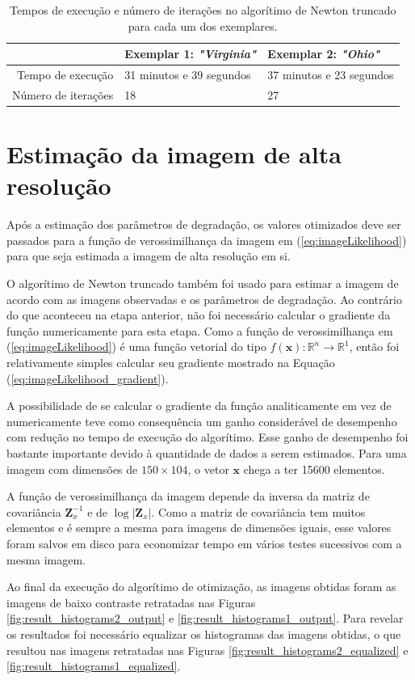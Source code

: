 \begin{table}[H]
	\caption{Tempos de execução e número de iterações no algorítimo de Newton truncado para cada um dos exemplares.}
	\label{tab:temposexec}
	\begin{tabular}{r || l | l}
		 & Exemplar 1: \emph{"Virginia"} & Exemplar 2: \emph{"Ohio"} \\ \hline
		Tempo de execução & 31 minutos e 39 segundos & 37 minutos e 23 segundos \\ \hline
		Número de iterações & 18 & 27
	\end{tabular}
\end{table}

\clearpage
\section{Estimação da imagem de alta resolução}
\label{sec:imgestimation}
Após a estimação dos parâmetros de degradação, os valores otimizados deve ser passados para a função de verossimilhança da imagem em (\ref{eq:imageLikelihood}) para que seja estimada a imagem de alta resolução em si.

O algorítimo de Newton truncado também foi usado para estimar a imagem de acordo com as imagens observadas e os parâmetros de degradação.
Ao contrário do que aconteceu na etapa anterior, não foi necessário calcular o gradiente da função numericamente para esta etapa.
Como a função de verossimilhança em (\ref{eq:imageLikelihood}) é uma função vetorial do tipo $ f(\mathbf{x}) : \mathbb{R}^n \to \mathbb{R}^1$, então foi relativamente simples calcular seu gradiente mostrado na Equação (\ref{eq:imageLikelihood_gradient}).

A possibilidade de se calcular o gradiente da função analiticamente em vez de numericamente teve como consequência um ganho considerável de desempenho com redução no tempo de execução do algorítimo.
Esse ganho de desempenho foi bastante importante devido à quantidade de dados a serem estimados.
Para uma imagem com dimensões de $150 \times 104$, o vetor $\mathbf{x}$ chega a ter 15600 elementos.

A função de verossimilhança da imagem depende da inversa da matriz de covariância $\mathbf{Z}_x^{-1}$ e de $\log{|\mathbf{Z}_x|}$.
Como a matriz de covariância tem muitos elementos e é sempre a mesma para imagens de dimensões iguais, esse valores foram salvos em disco para economizar tempo em vários testes sucessivos com a mesma imagem.

Ao final da execução do algorítimo de otimização, as imagens obtidas foram as imagens de
baixo contraste retratadas nas Figuras \ref{fig:result_histograms2_output} e
\ref{fig:result_histograms1_output}.
Para revelar os resultados foi necessário equalizar os histogramas das imagens obtidas,
o que resultou nas imagens retratadas nas Figuras \ref{fig:result_histograms2_equalized}
e \ref{fig:result_histograms1_equalized}.


